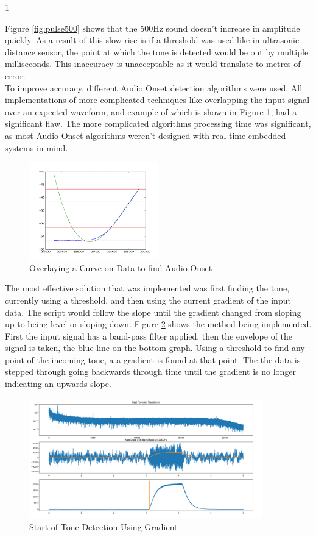 1\documentclass{article}
\begin{document}
Figure \ref{fig:pulse500} shows that the 500Hz sound doesn't increase in amplitude quickly. As a result of this slow rise is if a threshold was used like in ultrasonic distance sensor, the point at which the tone is detected would be out by multiple milliseconds. This inaccuracy is unacceptable as it would translate to metres of error.\\

To improve accuracy, different Audio Onset detection algorithms were used. All implementations of more complicated techniques like overlapping the input signal over an expected waveform, and example of which is shown in Figure \ref{fig:shapeOverlay}, had a significant flaw. The more complicated algorithms processing time was significant, as most Audio Onset algorithms weren't designed with real time embedded systems in mind.

\begin{figure}[H]
	\centering
	\noindent\includegraphics[width=0.5\textwidth]{images/signalShapeOverlay}
	\caption{Overlaying a Curve on Data to find Audio Onset}
	\label{fig:shapeOverlay}
\end{figure}

The most effective solution that was implemented was first finding the tone, currently using a threshold, and then using the current gradient of the input data. The script would follow the slope until the gradient changed from sloping up to being level or sloping down. Figure \ref{fig:gradient} shows the method being implemented. First the input signal has a band-pass filter applied, then the envelope of the signal is taken, the blue line on the bottom graph. Using a threshold to find any point of the incoming tone, a a gradient is found at that point. The the data is stepped through going backwards through time until the gradient is no longer indicating an upwards slope.

\begin{figure}[H]
	\centering
	\noindent\includegraphics[width=0.9\textwidth]{images/gradientDetection}
	\caption{Start of Tone Detection Using Gradient}
	\label{fig:gradient}
\end{figure}
\end{document}

